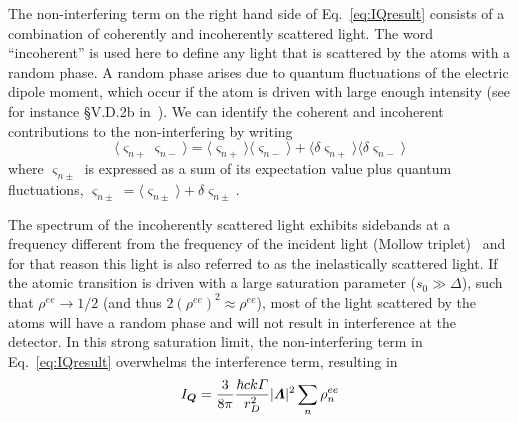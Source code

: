 The non-interfering term on the right hand side of Eq.~\ref{eq:IQresult}
consists of a combination of coherently and incoherently scattered light.  The
word ``incoherent'' is used here to define any light that is scattered by the
atoms with a random phase.    A random phase arises due to quantum fluctuations
of the electric dipole moment, which occur if the atom is driven with large
enough intensity (see for instance \S V.D.2b in~\cite{cohen1998atom}).  We can
identify the coherent and incoherent contributions to the non-interfering by
writing
\begin{equation}
  \langle \varsigma_{n+}  \varsigma_{n-} \rangle =  
  \langle \varsigma_{n+}\rangle \langle  \varsigma_{n-} \rangle  + 
  \langle \delta\varsigma_{n+}\rangle \langle  \delta\varsigma_{n-} \rangle  
\end{equation} 
where $\varsigma_{n\pm}$ is expressed as a sum of its expectation value plus
quantum fluctuations,  $\varsigma_{n\pm} = \langle \varsigma_{n\pm}\rangle +
\delta\varsigma_{n\pm}$. 

The spectrum of the incoherently scattered light exhibits sidebands at a
frequency different from the frequency of the incident light (Mollow
triplet)~\cite{PhysRev.188.1969,loudon2000quantum} and for that reason this
light is also referred to as the inelastically scattered light. If the atomic
transition is driven with a large saturation parameter ($s_{0}\gg\Delta$), such
that $\rho^{ee}\rightarrow 1/2$ (and thus $2(\rho^{ee})^{2} \approx \rho^{ee}$),
most of the light scattered by the atoms will have a random phase and will not
result in interference at the detector.  In this strong saturation limit, the
non-interfering term in Eq.~\ref{eq:IQresult} overwhelms the interference term,
resulting in
\begin{equation}
 I_{\bm{Q}}      = \frac{3}{8\pi} \frac{\hbar c k
\Gamma}{r_{D}^{2}}|\bm{\Lambda}|^{2} \sum_{n}  \rho_{n}^{ee}
\end{equation}



